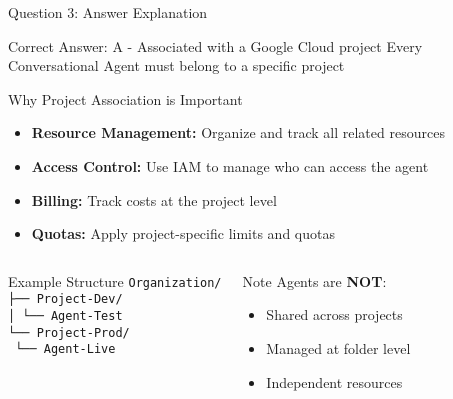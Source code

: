 \documentclass[aspectratio=169]{beamer}
\begin{document}
\begin{frame}{Question 3: Answer Explanation}
    \begin{alertblock}{Correct Answer: A - Associated with a Google Cloud project}
        \textcolor{googlegreen}{\faCheckCircle} Every Conversational Agent must belong to a specific project
    \end{alertblock}
    
    \begin{block}{Why Project Association is Important}
        \begin{itemize}
            \item \textbf{Resource Management:} Organize and track all related resources
            \item \textbf{Access Control:} Use IAM to manage who can access the agent
            \item \textbf{Billing:} Track costs at the project level
            \item \textbf{Quotas:} Apply project-specific limits and quotas
        \end{itemize}
    \end{block}
    
    \begin{columns}
        \begin{exampleblock}{Example Structure}
            \small
            \texttt{Organization/}\\
            \texttt{├── Project-Dev/}\\
            \texttt{│   └── Agent-Test}\\
            \texttt{└── Project-Prod/}\\
            \texttt{    └── Agent-Live}
        \end{exampleblock}
        
        \begin{block}{Note}
            Agents are \textbf{NOT}:
            \begin{itemize}
                \item Shared across projects
                \item Managed at folder level
                \item Independent resources
            \end{itemize}
        \end{block}
    \end{columns}
\end{frame}
\end{document}
